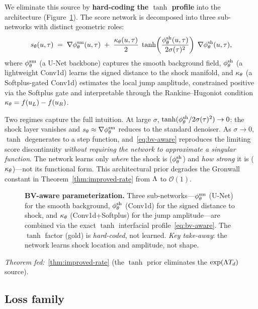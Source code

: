 We eliminate this source by \textbf{hard-coding the $\tanh$ profile} into the architecture (Figure~\ref{fig:bv-aware-arch}). The score network is decomposed into three sub-networks with distinct geometric roles:
\begin{equation}
  \label{eq:bv-aware}
  s_{\theta}(u,\tau) \;=\;
    \nabla\phi^{\mathrm{sm}}_{\theta}(u,\tau)
    \;+\;
    \frac{\kappa_{\theta}(u,\tau)}{2}
    \;\tanh\!\left(\frac{\phi^{\mathrm{sh}}_{\theta}(u,\tau)}{2\sigma(\tau)^{2}}\right)
    \;\nabla\phi^{\mathrm{sh}}_{\theta}(u,\tau),
\end{equation}
where $\phi^{\mathrm{sm}}_{\theta}$ (a {U-Net} backbone) captures the smooth background field, $\phi^{\mathrm{sh}}_{\theta}$ (a lightweight {Conv1d}) learns the signed distance to the shock manifold, and $\kappa_{\theta}$ (a {Softplus}-gated {Conv1d}) estimates the local jump amplitude, constrained positive via the Softplus gate and interpretable through the Rankine--Hugoniot condition $\kappa_{\theta} = f(u_{L})-f(u_{R})$.

Two regimes capture the full intuition. At large $\sigma$, $\tanh(\phi^{\mathrm{sh}}_{\theta}/2\sigma(\tau)^{2})\to0$: the shock layer vanishes and $s_{\theta}\approx\nabla\phi^{\mathrm{sm}}_{\theta}$ reduces to the standard denoiser. As $\sigma\to0$, $\tanh$ degenerates to a step function, and~\eqref{eq:bv-aware} reproduces the limiting score discontinuity \emph{without requiring the network to approximate a singular function}. The network learns only \emph{where} the shock is ($\phi^{\mathrm{sh}}_{\theta}$) and \emph{how strong} it is ($\kappa_{\theta}$)---not its functional form. This architectural prior degrades the Gronwall constant in Theorem~\ref{thm:improved-rate} from $\Lambda$ to $\mathcal{O}(1)$.

\begin{figure}[t]
    \centering
    \fbox{\rule[-.5\baselineskip]{0pt}{4.5cm} \rule[-.5\baselineskip]{0.95\textwidth}{0pt}}
    \caption{\textbf{BV-aware parameterization.} Three sub-networks---$\phi^{\mathrm{sm}}_{\theta}$ ({U-Net}) for the smooth background, $\phi^{\mathrm{sh}}_{\theta}$ ({Conv1d}) for the signed distance to shock, and $\kappa_{\theta}$ ({Conv1d}+{Softplus}) for the jump amplitude---are combined via the exact $\tanh$ interfacial profile~\eqref{eq:bv-aware}. The $\tanh$ factor (gold) is \emph{hard-coded}, not learned. \emph{Key take-away}: the network learns shock location and amplitude, not shape.}
    \label{fig:bv-aware-arch}
\end{figure}

\emph{Theorem fed:}~\ref{thm:improved-rate} (the $\tanh$ prior eliminates the $\exp(\Lambda T_{d})$ source).

\subsection{Loss family}
\label{sec:method:loss}

